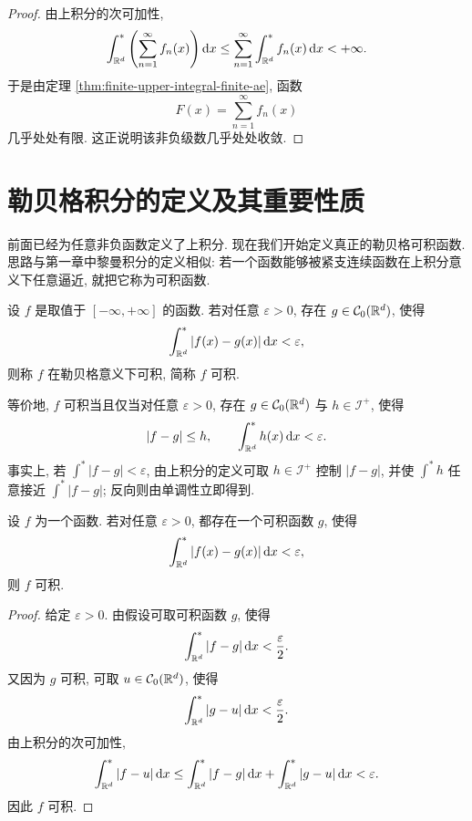 \begin{proof}
	由上积分的次可加性,
	\[
	\int_{\mathbb{R}^d}^{*}\left(\sum_{n=1}^{\infty}f_n(x)\right)\dd x
	\leq
	\sum_{n=1}^{\infty}\int_{\mathbb{R}^d}^{*}f_n(x)\,\dd x<+\infty.
	\]
	于是由定理 \ref{thm:finite-upper-integral-finite-ae}, 函数
	\[
	F(x)=\sum_{n=1}^{\infty}f_n(x)
	\]
	几乎处处有限. 这正说明该非负级数几乎处处收敛.
\end{proof}

\clearpage

\section{勒贝格积分的定义及其重要性质}
\label{sec:definition-properties-lebesgue-integral}

前面已经为任意非负函数定义了上积分. 现在我们开始定义真正的勒贝格可积函数. 思路与第一章中黎曼积分的定义相似: 若一个函数能够被紧支连续函数在上积分意义下任意逼近, 就把它称为可积函数.

\begin{defn}[勒贝格可积函数]
	\label{def:lebesgue-integrable-function}
	设 \(f\) 是取值于 \([-\infty,+\infty]\) 的函数. 若对任意 \(\varepsilon>0\), 存在 \(g\in\mathcal{C}_0(\mathbb{R}^d)\), 使得
	\begin{equation}
		\int_{\mathbb{R}^d}^{*}|f(x)-g(x)|\,\dd x<\varepsilon,
		\label{eq:lebesgue-integrable-definition}
	\end{equation}
	则称 \(f\) 在勒贝格意义下可积, 简称 \(f\) 可积.
\end{defn}

等价地, \(f\) 可积当且仅当对任意 \(\varepsilon>0\), 存在 \(g\in\mathcal{C}_0(\mathbb{R}^d)\) 与 \(h\in\mathcal I^+\), 使得
\[
|f-g|\leq h,
\qquad
\int_{\mathbb{R}^d}^{*}h(x)\,\dd x<\varepsilon.
\]
事实上, 若 \(\int^*|f-g|<\varepsilon\), 由上积分的定义可取 \(h\in\mathcal I^+\) 控制 \(|f-g|\), 并使 \(\int^*h\) 任意接近 \(\int^*|f-g|\); 反向则由单调性立即得到.

\begin{thm}[可积函数的稳定性准则]
	\label{thm:integrable-approx-by-integrable}
	设 \(f\) 为一个函数. 若对任意 \(\varepsilon>0\), 都存在一个可积函数 \(g\), 使得
	\[
	\int_{\mathbb{R}^d}^{*}|f(x)-g(x)|\,\dd x<\varepsilon,
	\]
	则 \(f\) 可积.
\end{thm}

\begin{proof}
	给定 \(\varepsilon>0\). 由假设可取可积函数 \(g\), 使得
	\[
	\int_{\mathbb{R}^d}^{*}|f-g|\,\dd x<\frac{\varepsilon}{2}.
	\]
	又因为 \(g\) 可积, 可取 \(u\in\mathcal{C}_0(\mathbb{R}^d)\), 使得
	\[
	\int_{\mathbb{R}^d}^{*}|g-u|\,\dd x<\frac{\varepsilon}{2}.
	\]
	由上积分的次可加性,
	\[
	\int_{\mathbb{R}^d}^{*}|f-u|\,\dd x
	\leq
	\int_{\mathbb{R}^d}^{*}|f-g|\,\dd x
	+
	\int_{\mathbb{R}^d}^{*}|g-u|\,\dd x
	<\varepsilon.
	\]
	因此 \(f\) 可积.
\end{proof}

